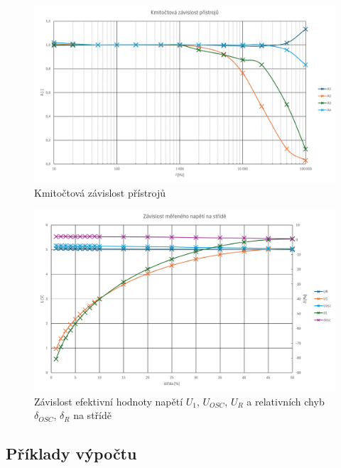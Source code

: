 \documentclass[a4paper, czech]{article}
\begin{document}
\begin{figure}[H]
    \centering
    \includegraphics[width=\textwidth]{graf1.png}
    \caption{Kmitočtová závislost přístrojů}
\end{figure}

\begin{figure}[H]
    \centering
    \includegraphics[width=\textwidth]{graf2.png}
    \caption{Závislost efektivní hodnoty napětí $U_1$, $U_{OSC}$, $U_R$ a relativních chyb $\delta_{OSC}$, $\delta_R$ na střídě}
\end{figure}


\subsection{Příklady výpočtu}
\end{document}
